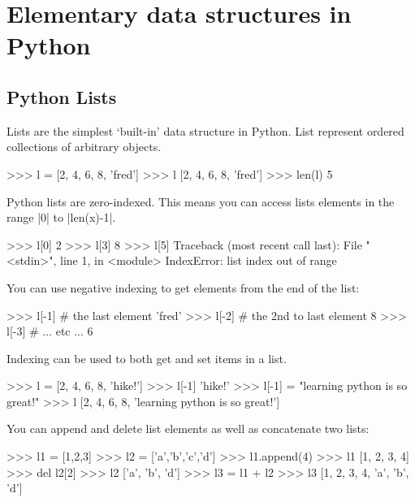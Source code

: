 

\section{Elementary data structures in Python}

\subsection{Python Lists}

Lists are the simplest `built-in' data structure in Python. List
represent ordered collections of arbitrary objects.
%
\begin{python}
>>> l = [2, 4, 6, 8, 'fred']
>>> l
[2, 4, 6, 8, 'fred']
>>> len(l)
5
\end{python}

Python lists are zero-indexed. This means you can access lists elements in the range 
|0| to |len(x)-1|.
%
\begin{python}
>>> l[0]
2
>>> l[3]
8
>>> l[5]
Traceback (most recent call last):
  File "<stdin>", line 1, in <module>
IndexError: list index out of range
\end{python}
%
You can use negative indexing to get elements from the end of the list:
\begin{python}
>>> l[-1] # the last element
'fred'
>>> l[-2] # the 2nd to last element
8
>>> l[-3] # ... etc ...
6
\end{python}

Indexing can be used to both get and set items in a list.
\begin{python}
>>> l = [2, 4, 6, 8, 'hike!']
>>> l[-1]
'hike!'
>>> l[-1] = "learning python is so great!"
>>> l
[2, 4, 6, 8, 'learning python is so great!']
\end{python}

You can  append and delete list elements as well as concatenate two lists:
\begin{python}
>>> l1 = [1,2,3]
>>> l2 = ['a','b','c','d']
>>> l1.append(4)
>>> l1
[1, 2, 3, 4]
>>> del l2[2]
>>> l2
['a', 'b', 'd']
>>> l3 = l1 + l2
>>> l3
[1, 2, 3, 4, 'a', 'b', 'd']
\end{python}

